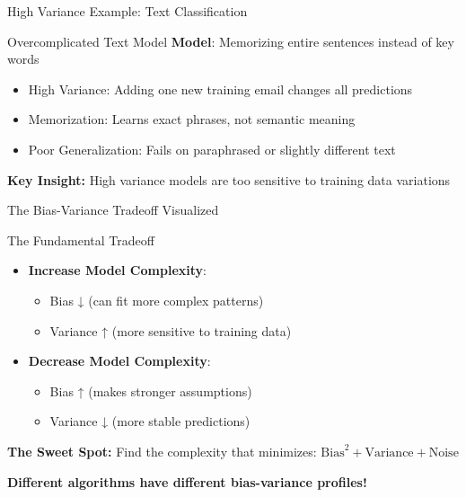 \documentclass[aspectratio=169,10pt]{beamer}
\begin{document}
\begin{frame}{High Variance Example: Text Classification}
\begin{examplebox}{Overcomplicated Text Model}
\textbf{Model}: Memorizing entire sentences instead of key words
\begin{itemize}
\item High Variance: Adding one new training email changes all predictions
\item Memorization: Learns exact phrases, not semantic meaning
\item Poor Generalization: Fails on paraphrased or slightly different text
\end{itemize}
\end{examplebox}

\begin{keypointsbox}
\textbf{Key Insight:} High variance models are too sensitive to training data variations
\end{keypointsbox}
\end{frame}


	

\begin{frame}{The Bias-Variance Tradeoff Visualized}
\begin{examplebox}{The Fundamental Tradeoff}
\begin{itemize}
\item \textbf{Increase Model Complexity}:
  \begin{itemize}
  \item Bias ↓ (can fit more complex patterns)
  \item Variance ↑ (more sensitive to training data)
  \end{itemize}
\item \textbf{Decrease Model Complexity}:
  \begin{itemize}
  \item Bias ↑ (makes stronger assumptions)
  \item Variance ↓ (more stable predictions)
  \end{itemize}
\end{itemize}
\end{examplebox}

\begin{keypointsbox}
\textbf{The Sweet Spot:}
Find the complexity that minimizes: $\text{Bias}^2 + \text{Variance} + \text{Noise}$
\end{keypointsbox}

\textbf{Different algorithms have different bias-variance profiles!}
\end{frame}
\end{document}
